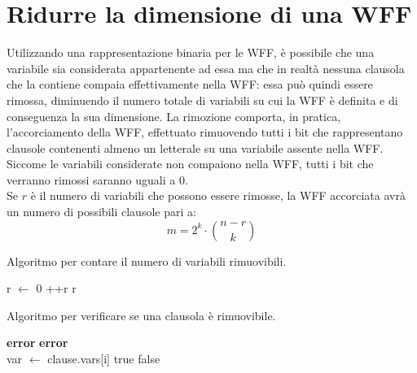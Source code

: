 \section{Ridurre la dimensione di una WFF}
Utilizzando una rappresentazione binaria per le WFF, è possibile che una variabile sia
considerata appartenente ad essa ma che in realtà nessuna clausola che la contiene compaia 
effettivamente nella WFF: essa può quindi essere rimossa, diminuendo il numero 
totale di variabili su cui la WFF è definita e di conseguenza la sua dimensione.
La rimozione comporta, in pratica, l'accorciamento della WFF, effettuato rimuovendo
tutti i bit che rappresentano clausole contenenti almeno un letterale su una variabile assente nella 
WFF.
Siccome le variabili considerate non compaiono nella WFF, tutti i bit che verranno rimossi
saranno uguali a 0.\\
Se $r$ è il numero di variabili che possono essere rimosse, la WFF accorciata
avrà un numero di possibili clausole pari a:
\begin{equation*}
    m = 2^k \cdot \binom{n-r}{k}
\end{equation*}

\begin{algorithm}[H]
    \caption{Algoritmo per contare il numero di variabili rimuovibili.}
    \label{alg:count_rem_vars}
    \begin{algorithmic}[1]
            \State r $\gets$ 0
                    \State ++r
                \EndIf
            \EndFor
            \State \Return r
        \EndProcedure
    \end{algorithmic}
\end{algorithm}

\begin{algorithm}[H]
    \caption{Algoritmo per verificare se una clausola è rimuovibile.}
    \begin{algorithmic}[1]
                \State \textbf{error}
            \EndIf
                    \State \textbf{error}
                \EndIf
            \EndFor\\

                \State var $\gets$ clause.vars[i]
                    \State \Return true
                \EndIf
            \EndFor
            \State \Return false
        \EndProcedure
    \end{algorithmic}
\end{algorithm}

